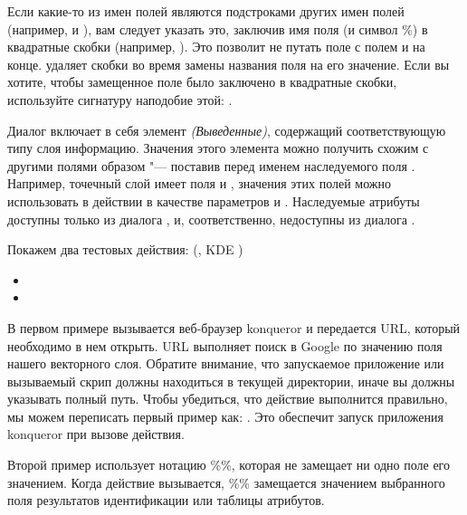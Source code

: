 Если какие-то из имен полей являются подстроками других имен полей (например,
 и ), вам следует указать это, заключив имя
поля (и символ \%) в квадратные скобки (например, \usertext{[\%col10]}).
Это позволит не путать поле  с полем  и
 на конце. \qg удаляет скобки во время замены названия поля
на его значение. Если вы хотите, чтобы замещенное поле было заключено
в квадратные скобки, используйте сигнатуру наподобие этой: \usertext{[[\%col10]]}.

Диалог  включает в себя элемент {\em (Выведенные)},
содержащий соответствующую типу слоя информацию. Значения этого элемента
можно получить схожим с другими полями образом "--- поставив перед именем
наследуемого поля . Например, точечный слой имеет поля
 и , значения этих полей можно использовать в действии
в качестве параметров  и .
Наследуемые атрибуты доступны только из диалога ,
и, соответственно, недоступны из диалога .

Покажем два тестовых действия: (\nix, KDE )

\begin{itemize}[label=--]
  \item {}
  \item {}
\end{itemize}

В первом примере вызывается веб-браузер konqueror и передается URL, который
необходимо в нем открыть. URL выполняет поиск в Google по значению поля
 нашего векторного слоя. Обратите внимание, что запускаемое
приложение или вызываемый скрип должны находиться в текущей директории,
иначе вы должны указывать полный путь. Чтобы убедиться, что действие
выполнится правильно, мы можем переписать первый пример как:
. Это
обеспечит запуск приложения konqueror при вызове действия.

Второй пример использует нотацию \%\%, которая не замещает ни одно поле
его значением. Когда действие вызывается, \%\% замещается значением выбранного
поля результатов идентификации или таблицы атрибутов.

\label{label_usingactions}

